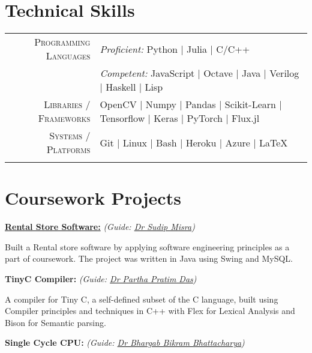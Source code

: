 \documentclass[a4paper,10pt]{extarticle} %
\begin{document}
\section{\textcolor{primary}{Technical Skills}}

\begin{tabular}{r|p{15cm}}
\textsc{Programming Languages} & \textit{Proficient:} Python | Julia | C/C++ \\
                               & \textit{Competent:} JavaScript | Octave | Java | Verilog | Haskell | Lisp \\
\textsc{Libraries / Frameworks} & OpenCV | Numpy | Pandas | Scikit-Learn | Tensorflow | Keras | PyTorch | Flux.jl \\
\textsc{Systems / Platforms} & Git | Linux | Bash | Heroku | Azure | \LaTeX \\ \\
\end{tabular}

\vspace{-0.3cm}
\section{\textcolor{primary}{Coursework Projects}}
\textbf{\href{https://github.com/Ayushk4/Rental-Store-Software}{Rental Store Software:}}
\textit{(Guide: \href{https://cse.iitkgp.ac.in/~smisra/}{Dr Sudip Misra})}

Built a Rental store software by applying software engineering principles as a part of coursework. The project was written in Java using Swing and MySQL.

\textbf{TinyC Compiler:} \textit{(Guide: \href{https://www.linkedin.com/in/ppdas}{Dr Partha Pratim Das})} 

A compiler for Tiny C, a self-defined subset of the C language, built using Compiler principles and techniques in C++ with Flex for Lexical Analysis and Bison for Semantic parsing.

\textbf{Single Cycle CPU:} \textit{(Guide: \href{https://www.linkedin.com/in/bhargab-b-bhattacharya-06530132/}{Dr Bhargab Bikram Bhattacharya})} 
\end{document}
